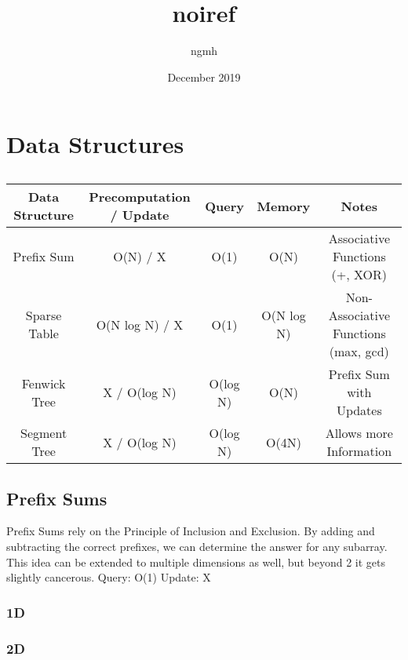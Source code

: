 \documentclass{article}
\title{noiref}
\author{ngmh}
\date{December 2019}
\begin{document}
\maketitle
\tableofcontents
\newpage

\section{Data Structures}

\begin{table}[H]
\begin{tabular}{|c|c|c|c|c|}
\hline
Data Structure & Precomputation / Update & Query    & Memory     & Notes                                \\ \hline
Prefix Sum     & O(N) / X                & O(1)     & O(N)       & Associative Functions (+, XOR)       \\ \hline
Sparse Table   & O(N log N) / X          & O(1)     & O(N log N) & Non-Associative Functions (max, gcd) \\ \hline
Fenwick Tree   & X / O(log N)            & O(log N) & O(N)       & Prefix Sum with Updates              \\ \hline
Segment Tree   & X / O(log N)            & O(log N) & O(4N)      & Allows more Information              \\ \hline
\end{tabular}
\caption{}
\label{tab:my-table}
\end{table}

\subsection{Prefix Sums}

\begin{flushleft}
Prefix Sums rely on the Principle of Inclusion and Exclusion.
By adding and subtracting the correct prefixes, we can determine
the answer for any subarray.
\newline
This idea can be extended to multiple dimensions as well, but beyond 2
it gets slightly cancerous.
\newline
Query: O(1)
\newline
Update: X
\end{flushleft}

\subsubsection{1D}

\subsubsection{2D}

\end{document}
